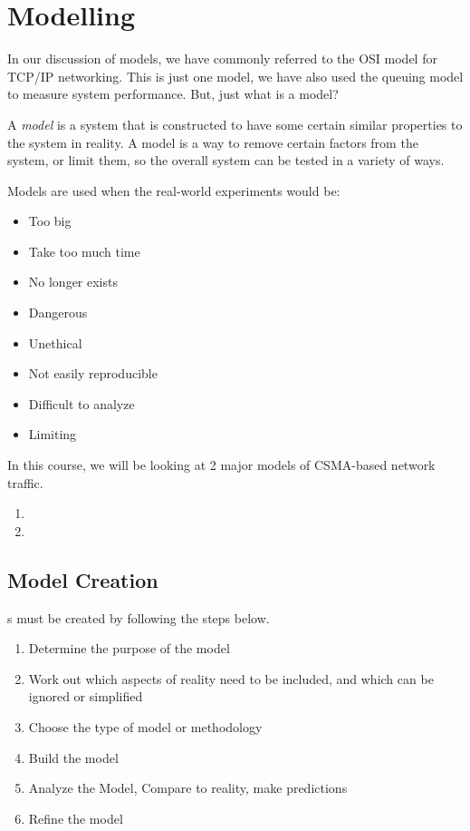 \section{Modelling}\label{sec:Modelling}
In our discussion of models, we have commonly referred to the OSI model for TCP/IP networking.
This is just one model, we have also used the queuing model to measure system performance.
But, just what is a model?
\begin{definition}[Model]\label{def:Model}
  A \emph{model} is a system that is constructed to have some certain similar properties to the system in reality.
  A model is a way to remove certain factors from the system, or limit them, so the overall system can be tested in a variety of ways.
\end{definition}

Models are used when the real-world experiments would be:
\begin{itemize}[noitemsep]
\item Too big
\item Take too much time
\item No longer exists
\item Dangerous
\item Unethical
\item Not easily reproducible
\item Difficult to analyze
\item Limiting
\end{itemize}

In this course, we will be looking at 2 major models of CSMA-based network traffic.
\begin{enumerate}[noitemsep]
\item {}
\item {}
\end{enumerate}

\subsection{Model Creation}\label{subsec:Model_Creation}
s must be created by following the steps below.
\begin{enumerate}[noitemsep]
\item Determine the purpose of the model
\item Work out which aspects of reality need to be included, and which can be ignored or simplified
\item Choose the type of model or methodology
\item Build the model
\item Analyze the Model, Compare to reality, make predictions
\item Refine the model
\end{enumerate}


